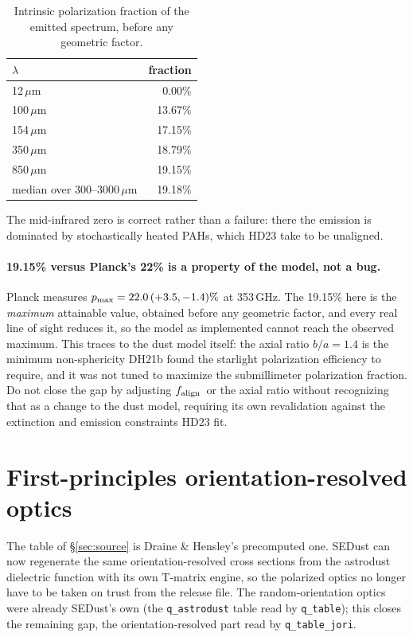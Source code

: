 \documentclass{my_memo}
\newcommand{\code}[1]{\texttt{#1}}
\newcommand{\um}{\ensuremath{\,\mu\mathrm{m}}}
\newcommand{\falign}{\ensuremath{f_{\rm align}}}
\begin{document}
\begin{table}[h]
\centering
\begin{tabular}{@{}lr@{}}
\toprule
$\lambda$ & fraction \\
\midrule
12\um                       & 0.00\% \\
100\um                      & 13.67\% \\
154\um                      & 17.15\% \\
350\um                      & 18.79\% \\
850\um                      & 19.15\% \\
median over 300--3000\um    & 19.18\% \\
\bottomrule
\end{tabular}
\caption{Intrinsic polarization fraction of the emitted spectrum, before any
geometric factor.}
\label{tab:polfrac}
\end{table}

The mid-infrared zero is correct rather than a failure: there the emission is
dominated by stochastically heated PAHs, which HD23 take to be unaligned.

\paragraph{19.15\% versus Planck's 22\% is a property of the model, not a bug.}
Planck measures $p_{\rm max} = 22.0\,(+3.5,-1.4)\%$ at 353\,GHz. The 19.15\%
here is the \emph{maximum} attainable value, obtained before any geometric
factor, and every real line of sight reduces it, so the model as implemented
cannot reach the observed maximum. This traces to the dust model itself: the
axial ratio $b/a = 1.4$ is the minimum non-sphericity DH21b found the starlight
polarization efficiency to require, and it was not tuned to maximize the
submillimeter polarization fraction. Do not close the gap by adjusting
\falign\ or the axial ratio without recognizing that as a change to the dust
model, requiring its own revalidation against the extinction and emission
constraints HD23 fit.

\section{First-principles orientation-resolved optics}\label{sec:firstprinciples}

The table of \S\ref{sec:source} is Draine \& Hensley's precomputed one. SEDust
can now regenerate the same orientation-resolved cross sections from the
astrodust dielectric function with its own T-matrix engine, so the polarized
optics no longer have to be taken on trust from the release file. The
random-orientation optics were already SEDust's own (the \code{q\_astrodust}
table read by \code{q\_table}); this closes the remaining gap, the
orientation-resolved part read by \code{q\_table\_jori}.
\end{document}
